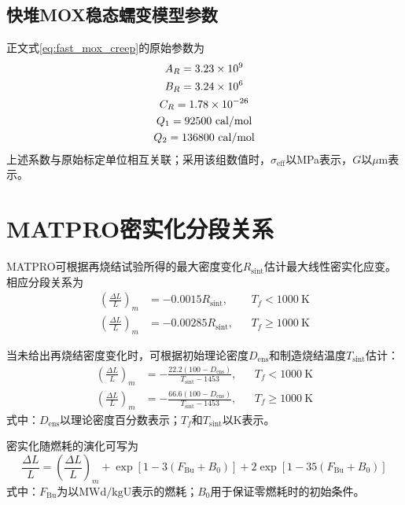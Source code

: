 \subsection{快堆MOX稳态蠕变模型参数}

正文式\eqref{eq:fast_mox_creep}的原始参数为
\begin{gather}
	A_R=3.23\times10^{9}
	\notag
	\\
	B_R=3.24\times10^{6}
	\notag
	\\
	C_R=1.78\times10^{-26}
	\notag
	\\
	Q_1=92500\ \mathrm{cal/mol}
	\notag
	\\
	Q_2=136800\ \mathrm{cal/mol}
	\label{eq:appendix_fast_mox_creep_parameters}
\end{gather}
上述系数与原始标定单位相互关联；采用该组数值时，$\sigma_{\mathrm{eff}}$以MPa表示，$G$以$\mu\mathrm{m}$表示。

\section{MATPRO密实化分段关系}
\label{app:mox_densification_correlations}

MATPRO可根据再烧结试验所得的最大密度变化$R_{\mathrm{sint}}$估计最大线性密实化应变。相应分段关系为
\begin{equation}
	\begin{aligned}
		\left(\frac{\Delta L}{L}\right)_m
				&=-0.0015R_{\mathrm{sint}},
				&&T_f<1000\ \mathrm{K}
				\\
				\left(\frac{\Delta L}{L}\right)_m
				&=-0.00285R_{\mathrm{sint}},
				&&T_f\geq1000\ \mathrm{K}
	\end{aligned}
	\label{eq:appendix_densification_resintering}
\end{equation}
\label{eq:appendix_densification_resintering_lowT}
\label{eq:appendix_densification_resintering_highT}

当未给出再烧结密度变化时，可根据初始理论密度$D_{\mathrm{ens}}$和制造烧结温度$T_{\mathrm{sint}}$估计：
\begin{equation}
	\begin{aligned}
		\left(\frac{\Delta L}{L}\right)_m
				&=-\frac{22.2(100-D_{\mathrm{ens}})}
				{T_{\mathrm{sint}}-1453},
				&&T_f<1000\ \mathrm{K}
				\\
				\left(\frac{\Delta L}{L}\right)_m
				&=-\frac{66.6(100-D_{\mathrm{ens}})}
				{T_{\mathrm{sint}}-1453},
				&&T_f\geq1000\ \mathrm{K}
	\end{aligned}
	\label{eq:appendix_densification_sintering_temperature}
\end{equation}
\label{eq:appendix_densification_sintering_lowT}
\label{eq:appendix_densification_sintering_highT}
\noindent 式中：$D_{\mathrm{ens}}$以理论密度百分数表示；$T_f$和$T_{\mathrm{sint}}$以K表示。

密实化随燃耗的演化可写为
\begin{equation}
	\frac{\Delta L}{L}
	=\left(\frac{\Delta L}{L}\right)_m
	+\exp\!\left[1-3(F_{\mathrm{Bu}}+B_0)\right]
	+2\exp\!\left[1-35(F_{\mathrm{Bu}}+B_0)\right]
	\label{eq:appendix_matpro_densification_evolution}
\end{equation}
\noindent 式中：$F_{\mathrm{Bu}}$为以$\mathrm{MWd/kgU}$表示的燃耗；$B_0$用于保证零燃耗时的初始条件。
